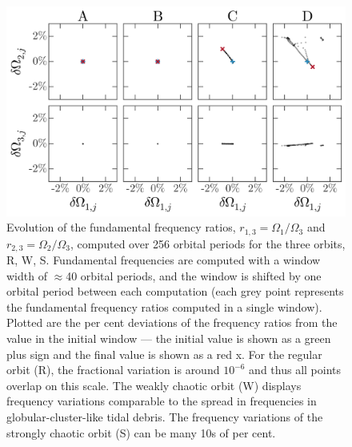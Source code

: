 \documentclass[letterpaper,12pt,preprint]{aastex}
\begin{document}
\clearpage
\begin{figure}[p]
\begin{center}
\includegraphics[width=\textwidth]{figures/freq-evolution.png}
\caption{Evolution of the fundamental frequency ratios, $r_{1,3} = \Omega_1 / \Omega_3$ and $r_{2,3} = \Omega_2 / \Omega_3$, computed over 256 orbital periods for the three orbits, R, W, S. Fundamental frequencies are computed with a window width of $\approx$40 orbital periods, and the window is shifted by one orbital period between each computation (each grey point represents the fundamental frequency ratios computed in a single window). Plotted are the per cent deviations of the frequency ratios from the value in the initial window --- the initial value is shown as a green plus sign and the final value is shown as a red x. For the regular orbit (R), the fractional variation is around $10^{-6}$ and thus all points overlap on this scale. The weakly chaotic orbit (W) displays frequency variations comparable to the spread in frequencies in globular-cluster-like tidal debris. The frequency variations of the strongly chaotic orbit (S) can be many 10s of per cent.} 
\label{fig:three-orbits-freqs}
\end{center}
\end{figure}
\end{document}
